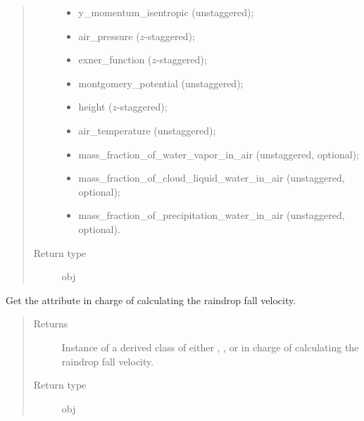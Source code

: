 \documentclass[letterpaper,10pt,english]{sphinxmanual}
\begin{document}
\begin{fulllineitems}
\begin{fulllineitems}
\begin{quote}
\begin{description}
\begin{itemize}
\item {} 
y\_momentum\_isentropic (unstaggered);

\item {} 
air\_pressure (\(z\)-staggered);

\item {} 
exner\_function (\(z\)-staggered);

\item {} 
montgomery\_potential (unstaggered);

\item {} 
height (\(z\)-staggered);

\item {} 
air\_temperature (unstaggered);

\item {} 
mass\_fraction\_of\_water\_vapor\_in\_air (unstaggered, optional);

\item {} 
mass\_fraction\_of\_cloud\_liquid\_water\_in\_air (unstaggered, optional);

\item {} 
mass\_fraction\_of\_precipitation\_water\_in\_air (unstaggered, optional).

\end{itemize}


\item[{Return type}] \leavevmode
obj

\end{description}\end{quote}

\end{fulllineitems}


\begin{fulllineitems}
\label{\detokenize{api:dycore.dycore_isentropic.DynamicalCoreIsentropic.microphysics}}
Get the attribute in charge of calculating the raindrop fall velocity.
\begin{quote}\begin{description}
\item[{Returns}] \leavevmode
Instance of a derived class of either
,
,
or  in
charge of calculating the raindrop fall velocity.

\item[{Return type}] \leavevmode
obj


\end{description}
\end{quote}
\end{fulllineitems}
\end{fulllineitems}
\end{document}
